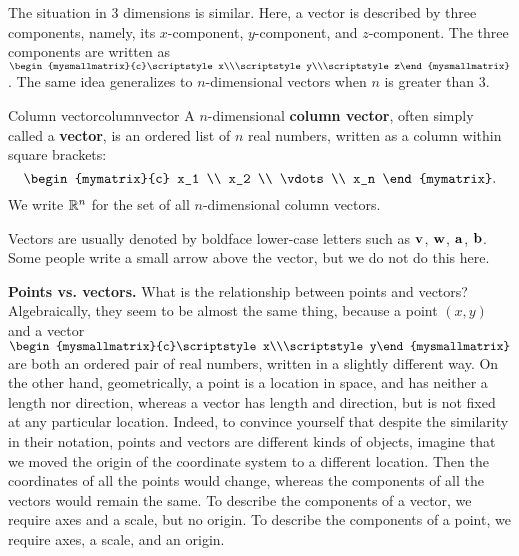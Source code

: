 The situation in $3$ dimensions is similar. Here, a vector is
described by three components, namely, its $x$-component,
$y$-component, and $z$-component. The three components are written as
$\begin{mysmallmatrix}{c}\scriptstyle x\\\scriptstyle y\\\scriptstyle
  z\end{mysmallmatrix}$. The same idea generalizes to $n$-dimensional
vectors when $n$ is greater than $3$. 

\begin{definition}{Column vector}{columnvector}
  A $n$-dimensional
  \textbf{column vector},
  often simply called a \textbf{vector}, is an ordered list
  of $n$ real numbers, written as a column within square brackets:
  \begin{equation*}
    \begin{mymatrix}{c}
      x_1 \\
      x_2 \\
      \vdots \\
      x_n
    \end{mymatrix}.
  \end{equation*}
  We write $\mathbb{R}^n$ for the set of all $n$-dimensional
  column vectors.
\end{definition}
Vectors are usually denoted by boldface lower-case letters such as
${\bf v}$, ${\bf w}$, ${\bf a}$, ${\bf b}$. Some people write a
small arrow above the vector, but we do not do this here.
\bigskip

\noindent\textbf{Points vs. vectors.}
What is the relationship between points and vectors? Algebraically,
they seem to be almost the same thing, because a point $(x,y)$ and a
vector
$\begin{mysmallmatrix}{c}\scriptstyle x\\\scriptstyle
  y\end{mysmallmatrix}$ are both an ordered pair of real numbers,
written in a slightly different way. On the other hand, geometrically,
a point is a location in space, and has neither a length nor
direction, whereas a vector has length and direction, but is not fixed
at any particular location. Indeed, to convince yourself that despite
the similarity in their notation, points and vectors are different
kinds of objects, imagine that we moved the origin of the coordinate
system to a different location. Then the coordinates of all the points
would change, whereas the components of all the vectors would remain
the same. To describe the components of a vector, we require axes and
a scale, but no origin. To describe the components of a point, we
require axes, a scale, and an origin.  \bigskip

